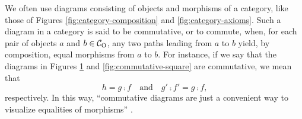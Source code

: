 \begin{definition}



  \label{def:commutative-diagram}


  We often use diagrams consisting of objects and morphisms of a
  category, like those of Figures \ref{fig:category-composition} and
  \ref{fig:category-axioms}. Such a diagram in a category  is
  said to be commutative, or to commute, when, for each pair of
  objects $a$ and $b \in \mathcal{C}_{\operatorname{O}}$, any two paths leading from $a$ to
  $b$ yield, by composition, equal morphisms from $a$ to $b$. For
  instance, if we say that the diagrams in Figures
  \ref{fig:commutative-triangle} and \ref{fig:commutative-square} are
  commutative, we mean that
  \begin{equation*}
    h = g \comp f
    \quad
    \text{and}
    \quad
    g' \comp f' = g \comp f
    \text{,}
  \end{equation*}
  respectively. In this way, ``commutative diagrams are just a
  convenient way to visualize equalities of morphisms''
  \parencite[434]{poigne-1992}.

  \begin{figure}[htbp]
    \begin{subfigure}{0.5\linewidth}
      \begin{center}
      \end{center}
      \caption{}
      \label{fig:commutative-triangle}
    \end{subfigure}
    \begin{subfigure}{0.5\linewidth}
      \begin{center}
\end{center}
\end{subfigure}
\end{figure}
\end{definition}
